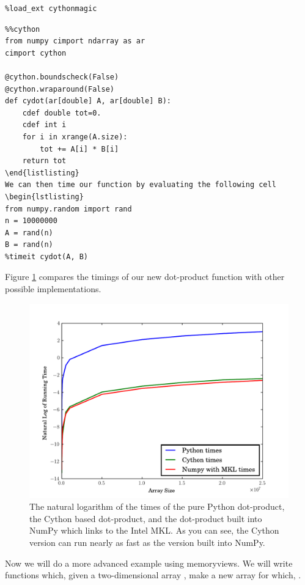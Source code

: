 \begin{lstlisting}
%load_ext cythonmagic
\end{lstlisting}

\begin{lstlisting}
%%cython
from numpy cimport ndarray as ar
cimport cython

@cython.boundscheck(False)
@cython.wraparound(False)
def cydot(ar[double] A, ar[double] B):
    cdef double tot=0.
    cdef int i
    for i in xrange(A.size):
        tot += A[i] * B[i]
    return tot
\end{listlisting}
We can then time our function by evaluating the following cell
\begin{lstlisting}
from numpy.random import rand
n = 10000000
A = rand(n)
B = rand(n)
%timeit cydot(A, B)
\end{lstlisting}

Figure \ref{cython:dot} compares the timings of our new dot-product function with other possible implementations.

\begin{figure}
\includegraphics[width=\textwidth]{dot.pdf}
\caption{
The natural logarithm of the times of the pure Python dot-product, the Cython based dot-product, and the dot-product built into NumPy which links to the Intel MKL.
As you can see, the Cython version can run nearly as fast as the version built into NumPy.
}
\label{cython:dot}
\end{figure}

Now we will do a more advanced example using memoryviews.
We will write functions which, given a two-dimensional array , make a new array  for which, .

